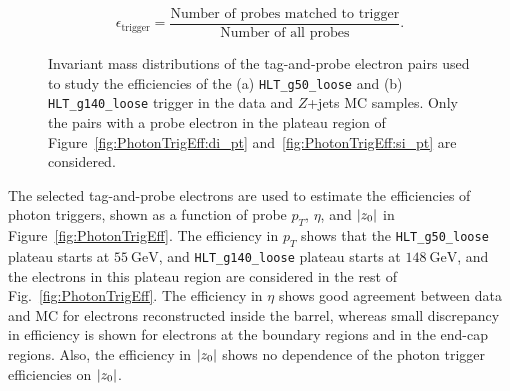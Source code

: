 \begin{equation}
	\label{eq:TrigEff}
    \epsilon_{\mathrm{trigger}} = \frac{\textrm{Number of probes matched to trigger}}{\textrm{Number of all probes}}.
\end{equation}
%
\begin{figure}[!htb]
    \centering
    \caption{Invariant mass distributions of the tag-and-probe electron pairs used to study the efficiencies of the (a) \texttt{HLT\_g50\_loose} and (b) \texttt{HLT\_g140\_loose} trigger in the data and $Z$+jets MC samples. Only the pairs with a probe electron in the plateau region of Figure~\ref{fig:PhotonTrigEff:di_pt} and~\ref{fig:PhotonTrigEff:si_pt} are considered.
    }
    \label{fig:PhotonTrigMass}
\end{figure}

The selected tag-and-probe electrons are used to estimate the efficiencies of photon triggers, shown as a function of probe $p_{T}$, $\eta$, and $|z_{0}|$ in Figure~\ref{fig:PhotonTrigEff}. The efficiency in $p_{T}$ shows that the \texttt{HLT\_g50\_loose} plateau starts at $55~\si{\GeV}$, and \texttt{HLT\_g140\_loose} plateau starts at $148~\si{\GeV}$, and the electrons in this plateau region are considered in the rest of Fig.~\ref{fig:PhotonTrigEff}. The efficiency in $\eta$ shows good agreement between data and MC for electrons reconstructed inside the barrel, whereas small discrepancy in efficiency is shown for electrons at the boundary regions and in the end-cap regions. Also, the efficiency in $|z_{0}|$ shows no dependence of the photon trigger efficiencies on $|z_{0}|$.

